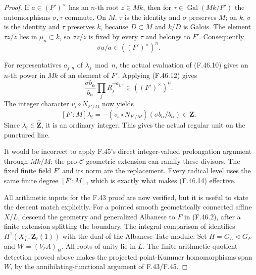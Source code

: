 \begin{proof}
If \(a\in(F')^\times\) has an \(n\)-th root \(z\in Mk\), then for
\(\tau\in\operatorname{Gal}(Mk/F')\) the automorphisms
\(\sigma,\tau\) commute. On \(M\), \(\tau\) is the identity and
\(\sigma\) preserves \(M\); on \(k\), \(\sigma\) is the identity
and \(\tau\) preserves \(k\), because \(D\subset M\) and \(k/D\)
is Galois. The element \(\tau z/z\) lies in \(\mu_n\subset k\), so
\(\sigma z/z\) is fixed by every \(\tau\) and belongs to \(F'\).
Consequently
\[
                 \sigma a/a\in((F')^\times)^n.             \tag{F.46.12}
\]

For representatives \(a_{j,n}\) of \(\lambda_j\bmod n\), the actual
evaluation of \textup{(F.46.10)} gives an \(n\)-th power in \(Mk\) of an element
of \(F'\). Applying \textup{(F.46.12)} gives
\[
 \frac{\sigma b_\alpha}{b_\alpha}
                 \prod_jR_j^{-a_{j,n}}
                          \in((F')^\times)^n.              \tag{F.46.13}
\]
The integer character \(v_i\circ N_{F'/M}\) now yields
\[
 [F':M]\lambda_i
   =-(v_i\circ N_{F'/M})(\sigma b_\alpha/b_\alpha)
                         \in\mathbf Z.                    \tag{F.46.14}
\]
Since \(\lambda_i\in\widehat{\mathbf Z}\), it is an ordinary integer.
This gives the actual regular unit on the punctured line.

It would be incorrect to apply F.45's direct integer-valued prolongation
argument through \(Mk/M\): the pro-\(\mathcal C\) geometric extension
can ramify these divisors. The fixed finite field \(F'\) and its norm
are the replacement. Every radical level uses the same finite
degree \([F':M]\), which is exactly what makes \textup{(F.46.14)} effective.


All arithmetic inputs for the F.43 proof are now verified, but it is
useful to state the descent match explicitly. For a pointed smooth
geometrically connected affine \(X/L\), descend the geometry and
generalized Albanese to \(F\) in \textup{(F.46.2)}, after a finite extension splitting
the boundary. The integral comparison of \citet[Propositions~4.1 and~4.3, Corollary~4.2]{F_SpiessSzamuely2003} identifies
\(H^1(X_{\bar L},\mathbf Z_\ell(1))\) with the dual of the Albanese
Tate module. Set \(H=G_L\triangleleft G_F\) and
\(W=(V_\ell A)_H\). All roots of unity lie in \(L\). The finite
arithmetic quotient detection proved above makes the projected
point-Kummer homomorphisms span \(W\), by the annihilating-functional
argument of F.43/F.45.


\end{proof}
